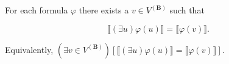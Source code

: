 For each formula $\varphi$ there exists a $v \in V^{(\mathbf{B})}$ such that

$$\llbracket (\exists u) \varphi(u) \rrbracket = \llbracket \varphi(v) \rrbracket.$$

Equivalently, $(\exists v \in V^{(\mathbf{B})}) [\llbracket (\exists u) \varphi(u) \rrbracket = \llbracket \varphi(v) \rrbracket]$.
